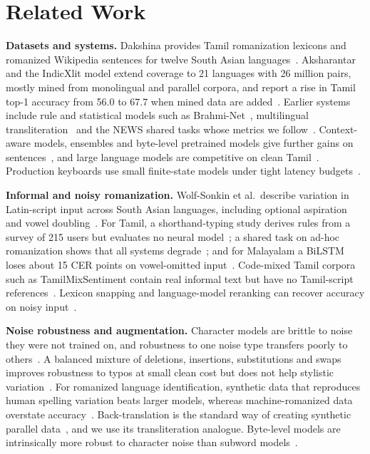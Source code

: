 \section{Related Work}
\textbf{Datasets and systems.}
Dakshina provides Tamil romanization lexicons and romanized Wikipedia sentences for twelve South Asian languages~\cite{roark2020dakshina}.
Aksharantar and the IndicXlit model extend coverage to 21 languages with 26 million pairs, mostly mined from monolingual and parallel corpora, and report a rise in Tamil top-1 accuracy from 56.0 to 67.7 when mined data are added~\cite{madhani2023aksharantar}.
Earlier systems include rule and statistical models such as Brahmi-Net~\cite{kunchukuttan2015brahminet}, multilingual transliteration~\cite{kunchukuttan2018orthographic,kunchukuttan2021largescale} and the NEWS shared tasks whose metrics we follow~\cite{chen2018news}.
Context-aware models, ensembles and byte-level pretrained models give further gains on sentences~\cite{kirov2024context,xue2022byt5}, and large language models are competitive on clean Tamil~\cite{azam2025beyond}.
Production keyboards use small finite-state models under tight latency budgets~\cite{hellsten2017keyboard}.

\textbf{Informal and noisy romanization.}
Wolf-Sonkin et al.\ describe variation in Latin-script input across South Asian languages, including optional aspiration and vowel doubling~\cite{wolfsonkin2019latin}.
For Tamil, a shorthand-typing study derives rules from a survey of 215 users but evaluates no neural model~\cite{herath2024tamzhi}; a shared task on ad-hoc romanization shows that all systems degrade~\cite{sumanathilaka2025indonlp}; and for Malayalam a BiLSTM loses about 15 CER points on vowel-omitted input~\cite{baiju2024malayalam}.
Code-mixed Tamil corpora such as TamilMixSentiment contain real informal text but have no Tamil-script references~\cite{chakravarthi2020tamilmix}.
Lexicon snapping and language-model reranking can recover accuracy on noisy input~\cite{mandal2018normalization,gulcehre2015monolingual}.

\textbf{Noise robustness and augmentation.}
Character models are brittle to noise they were not trained on, and robustness to one noise type transfers poorly to others~\cite{belinkov2018synthetic}.
A balanced mixture of deletions, insertions, substitutions and swaps improves robustness to typos at small clean cost but does not help stylistic variation~\cite{karpukhin2019training}.
For romanized language identification, synthetic data that reproduces human spelling variation beats larger models, whereas machine-romanized data overstate accuracy~\cite{benton2025romanizedlid,madhani2023bhasha,gharami2025indotranslit}.
Back-translation is the standard way of creating synthetic parallel data~\cite{sennrich2016backtranslation}, and we use its transliteration analogue.
Byte-level models are intrinsically more robust to character noise than subword models~\cite{xue2022byt5,sennrich2016bpe}.


